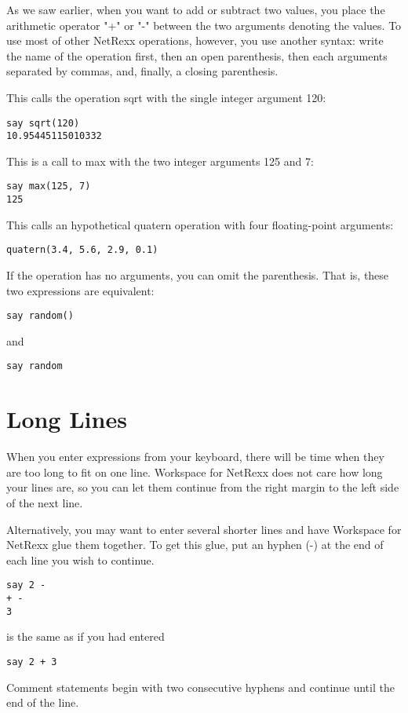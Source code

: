 As we saw earlier, when you want to add or subtract two values, you place the arithmetic operator "+" or "-" between the two arguments denoting the values. To use most of other NetRexx operations, however, you use another syntax: write the name of the operation first, then an open parenthesis, then each arguments separated by commas, and, finally, a closing parenthesis.

This calls the operation sqrt with the single integer argument 120:
\begin{verbatim}
say sqrt(120)
10.95445115010332
\end{verbatim}
This is a call to max with the two integer arguments 125 and 7:

\begin{verbatim}
say max(125, 7)
125
\end{verbatim}
This calls an hypothetical quatern operation with four floating-point arguments:

\begin{verbatim}
quatern(3.4, 5.6, 2.9, 0.1)
\end{verbatim}
If the operation has no arguments, you can omit the parenthesis. That is, these two expressions are equivalent:

\begin{verbatim}
say random()
\end{verbatim}
and

\begin{verbatim}
say random
\end{verbatim}

 \section{Long Lines}

When you enter expressions from your keyboard, there will be time when they are too long to fit on one line. Workspace for NetRexx does not care how long your lines are, so you can let them continue from the right margin to the left side of the next line.

Alternatively, you may want to enter several shorter lines and have Workspace for NetRexx glue them together. To get this glue, put an hyphen (-) at the end of each line you wish to continue.
\begin{verbatim}
say 2 -
+ -
3
\end{verbatim}
is the same as if you had entered

\begin{verbatim}
say 2 + 3
\end{verbatim}
Comment statements begin with two consecutive hyphens and continue until the end of the line.

